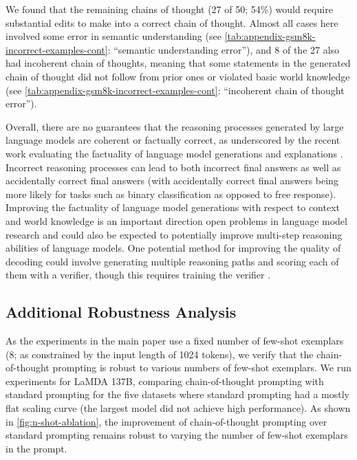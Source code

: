 \documentclass[]{article}
\theoremstyle{plain}
\theoremstyle{definition}
\theoremstyle{remark}
\newcommand{\orange}[1]{#1}
\newcommand{\lamda}[0]{LaMDA}
\begin{document}


We found that the remaining chains of thought (27 of 50; 54\%) would require substantial edits to make into a correct chain of thought.
Almost all cases here involved some error in semantic understanding (see \cref{tab:appendix-gsm8k-incorrect-examples-cont}: ``semantic understanding error''), and 8 of the 27 also had incoherent chain of thoughts, meaning that some statements in the generated chain of thought did not follow from prior ones or violated basic world knowledge (see \cref{tab:appendix-gsm8k-incorrect-examples-cont}: ``incoherent chain of thought error'').



\orange{Overall, there are no guarantees that the reasoning processes generated by large language models are coherent or factually correct, as underscored by the recent work evaluating the factuality of language model generations and explanations \citep{maynez-etal-2020-faithfulness,rashkin2021measuring,ye2022unreliability,marasovic2021few,wiegreffe2021reframing}. Incorrect reasoning processes can lead to both incorrect final answers as well as accidentally correct final answers (with accidentally correct final answers being more likely for tasks such as binary classification as opposed to free response). Improving the factuality of language model generations with respect to context and world knowledge is an important direction open problems in language model research and could also be expected to potentially improve multi-step reasoning abilities of language models. One potential method for improving the quality of decoding could involve generating multiple reasoning paths and scoring each of them with a verifier, though this requires training the verifier \citep{cobbe2021training,shen-etal-2021-generate-rank,thoppilan2022lamda}.}

\subsection{Additional Robustness Analysis}\label{subsec:additional-robustness}
As the experiments in the main paper use a fixed number of few-shot exemplars (8; as constrained by the input length of 1024 tokens), we verify that the chain-of-thought prompting is robust to various numbers of few-shot exemplars. 
We run experiments for \lamda{} 137B, comparing chain-of-thought prompting with standard prompting for the five datasets where standard prompting had a mostly flat scaling curve (the largest model did not achieve high performance). 
As shown in \cref{fig:n-shot-ablation}, the improvement of chain-of-thought prompting over standard prompting remains robust to varying the number of few-shot exemplars in the prompt.
\end{document}
